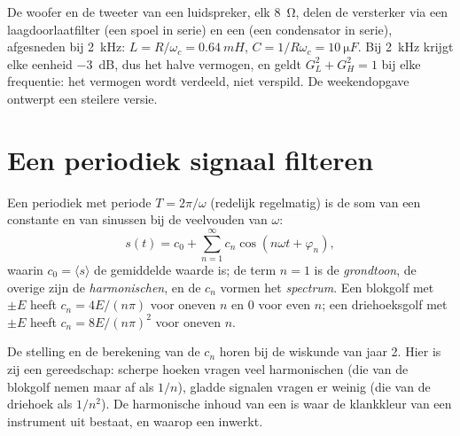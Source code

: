 \begin{example}\label{ex:b1:filters-transfer-functions:crossover}
De woofer en de tweeter van een luidspreker, elk \qty{8}{\ohm}, delen de
versterker via een laagdoorlaatfilter (een spoel in serie) en een
 (een condensator in serie), afgesneden bij \qty{2}{kHz}: $L = R/\omega_c = \qty{0.64}{mH}$,
$C = 1/R\omega_c = \qty{10}{\micro F}$. Bij \qty{2}{kHz} krijgt elke eenheid
\qty{-3}{dB}, dus het halve vermogen, en geldt $G_L^2 + G_H^2 = 1$ bij elke
frequentie: het vermogen wordt verdeeld, niet verspild. De weekendopgave ontwerpt
een steilere versie.
\end{example}

\section{Een periodiek signaal filteren}

\begin{theorem}[Fourierontbinding]\label{thm:b1:filters-transfer-functions:fourier}
Een periodiek  met periode $T = 2\pi/\omega$ (redelijk regelmatig) is
de som van een constante en van sinussen bij de veelvouden van $\omega$:
\[
s(t) = c_0 + \sum_{n = 1}^{\infty} c_n\cos(n\omega t + \varphi_n),
\]
waarin $c_0 = \langle s\rangle$ de gemiddelde waarde is; de term $n = 1$ is
de \emph{grondtoon}, de overige zijn de \emph{harmonischen}, en de
 $c_n$ vormen het \emph{spectrum}. Een blokgolf met 
$\pm E$ heeft $c_n = 4E/(n\pi)$ voor oneven $n$ en $0$ voor even $n$; een
driehoeksgolf met  $\pm E$ heeft $c_n = 8E/(n\pi)^2$ voor oneven $n$.
\end{theorem}
\admitted

\begin{remark}\label{rem:b1:filters-transfer-functions:fourier}
De stelling en de berekening van de $c_n$ horen bij de wiskunde van
jaar 2. Hier is zij een gereedschap: scherpe hoeken vragen veel
harmonischen (die van de blokgolf nemen maar af als $1/n$), gladde signalen
vragen er weinig (die van de driehoek als $1/n^2$). De harmonische inhoud van een
 is waar de klankkleur van een instrument uit bestaat, en waarop een  inwerkt.
\end{remark}

